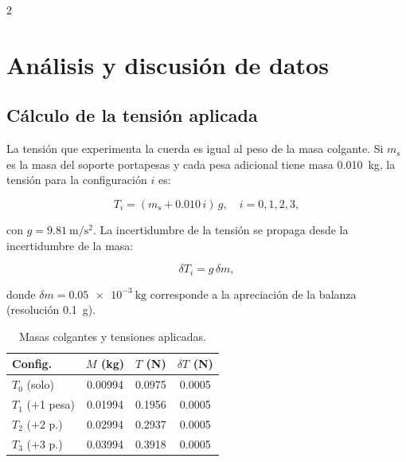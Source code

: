 \documentclass[12pt,a4paper]{article}
\newcommand{\gacc}{\SI{9.81}{\metre\per\second\squared}}
\newcommand{\ms}{m_{\mathrm{s}}}
\begin{document}
\begin{multicols}{2}
\section{Análisis y discusión de datos}

\subsection{Cálculo de la tensión aplicada}

La tensión que experimenta la cuerda es igual al peso de la masa colgante. Si $\ms$ es la masa del soporte portapesas y cada pesa adicional tiene masa \SI{0.010}{\kilogram}, la tensión para la configuración $i$ es:

\begin{equation}
  T_i = (\ms + 0.010\,i)\,g,\quad i = 0,1,2,3,
  \label{eq:tension}
\end{equation}

con $g = \gacc$. La incertidumbre de la tensión se propaga desde la incertidumbre de la masa:

\begin{equation}
  \delta T_i = g\,\delta m,
  \label{eq:deltaTension}
\end{equation}

donde $\delta m = \SI{0.05e-3}{\kilogram}$ corresponde a la apreciación de la balanza (resolución \SI{0.1}{\gram}).

\begin{table}[H]
  \centering
  \caption{Masas colgantes y tensiones aplicadas.}
  \label{tab:tensiones}
  \vspace{0.3cm}
  \small
  \setlength{\tabcolsep}{3pt}
  \begin{tabular}{lccc}
    \toprule
    Config. & $M$ (kg) & $T$ (N) & $\delta T$ (N) \\
    \midrule
    $T_0$ (solo)     & \num{0.00994} & \num{0.0975} & \num{0.0005} \\
    $T_1$ ($+$1 pesa)& \num{0.01994} & \num{0.1956} & \num{0.0005} \\
    $T_2$ ($+$2 p.)  & \num{0.02994} & \num{0.2937} & \num{0.0005} \\
    $T_3$ ($+$3 p.)  & \num{0.03994} & \num{0.3918} & \num{0.0005} \\
    \bottomrule
  \end{tabular}
\end{table}


\end{multicols}
\end{document}
